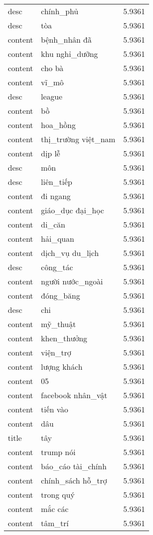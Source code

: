 \documentclass{article}
\begin{document}
\begin{tabular}{lll}
desc & chính\_phủ & 5.9361\\
desc & tòa & 5.9361\\
content & bệnh\_nhân đã & 5.9361\\
content & khu nghỉ\_dưỡng & 5.9361\\
content & cho bà & 5.9361\\
content & vĩ\_mô & 5.9361\\
desc & league & 5.9361\\
content & bồ & 5.9361\\
content & hoa\_hồng & 5.9361\\
content & thị\_trường việt\_nam & 5.9361\\
content & dịp lễ & 5.9361\\
desc & môn & 5.9361\\
desc & liên\_tiếp & 5.9361\\
content & đi ngang & 5.9361\\
content & giáo\_dục đại\_học & 5.9361\\
content & di\_căn & 5.9361\\
content & hải\_quan & 5.9361\\
content & dịch\_vụ du\_lịch & 5.9361\\
desc & công\_tác & 5.9361\\
content & người nước\_ngoài & 5.9361\\
content & đóng\_băng & 5.9361\\
desc & chi & 5.9361\\
content & mỹ\_thuật & 5.9361\\
content & khen\_thưởng & 5.9361\\
content & viện\_trợ & 5.9361\\
content & lượng khách & 5.9361\\
content & 05 & 5.9361\\
content & facebook nhân\_vật & 5.9361\\
content & tiến vào & 5.9361\\
content & dâu & 5.9361\\
title & tây & 5.9361\\
content & trump nói & 5.9361\\
content & báo\_cáo tài\_chính & 5.9361\\
content & chính\_sách hỗ\_trợ & 5.9361\\
content & trong quý & 5.9361\\
content & mắc các & 5.9361\\
content & tâm\_trí & 5.9361\\

\end{tabular}
\end{document}
